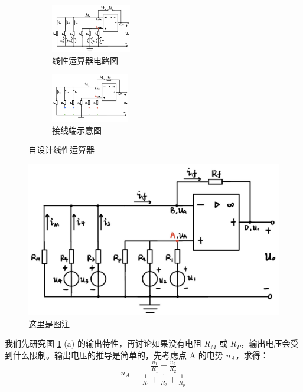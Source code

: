 \documentclass[a4paper]{article}  %
\theoremstyle{MyLineTheoremStyle} %
\theoremstyle{MyBlockTheoremStyle} %
\theoremstyle{MySubsubsectionStyle} %
\begin{document}
\begin{multicols*}{4}
\begin{figure}[H]\centering
\begin{subfigure}[t]{0.49\columnwidth}\centering
\includegraphics[height=60pt]{assets/线性运算器.png}
\caption{ 线性运算器电路图 }
\end{subfigure}\begin{subfigure}[t]{0.49\columnwidth}\centering
\includegraphics[height=60pt]{assets/线性运算器接线端.png}
\caption{ 接线端示意图 }
\end{subfigure}
\caption{ 自设计线性运算器 }\label{自设计线性运算器}
\end{figure}

\lipsum[3-4]    %
\begin{figure}[H]\centering
\includegraphics[width=0.8\columnwidth]{assets/线性运算器.png}
\caption{ 这里是图注}\label{这里是图注}
\end{figure}

我们先研究图 \ref{自设计线性运算器} (a) 的输出特性，再讨论如果没有电阻 $R_M$ 或 $R_P$，输出电压会受到什么限制。输出电压的推导是简单的，先考虑点 A 的电势 $u_A$，求得：
\begin{equation}
u_A = \frac{\frac{u_1}{R_1} + \frac{u_2}{R_2}}{\frac{1}{R_1} + \frac{1}{R_2} + \frac{1}{R_p}}
\end{equation}


\end{multicols*}
\end{document}
